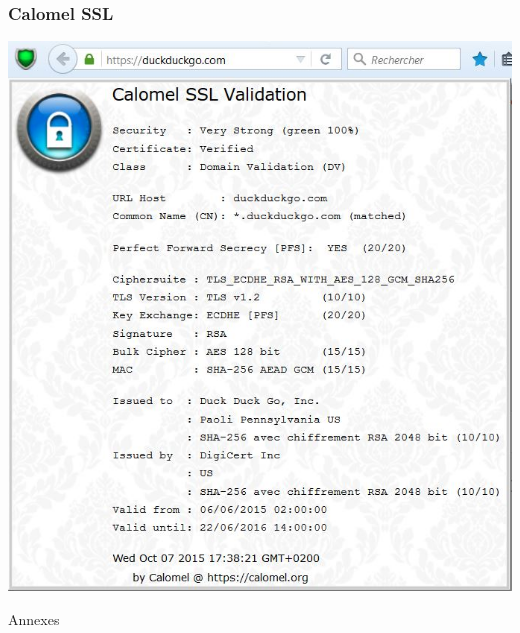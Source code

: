 \documentclass{beamer}
\begin{document}
\begin{frame}
\frametitle{Calomel SSL}
\begin{center}
\includegraphics[scale=0.5] {./images/Calomel.jpg}
\end{center}
\end{frame}

\begin{frame}
\begin{center}
\Huge{Annexes}
\end{center}
\end{frame}
\end{document}
